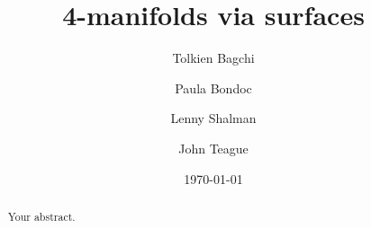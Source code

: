 \documentclass[11pt]{amsart}
\title{4-manifolds via surfaces}
\author[T.\ Baghchi]{Tolkien Bagchi}
\author[P.\ Bondoc]{Paula Bondoc}
\author[L.\ Shalman]{Lenny Shalman}
\author[J.\ Teague]{John Teague}
\date{\today}
\begin{document}
\maketitle

\begin{abstract}
Your abstract.
\end{abstract}
\end{document}
